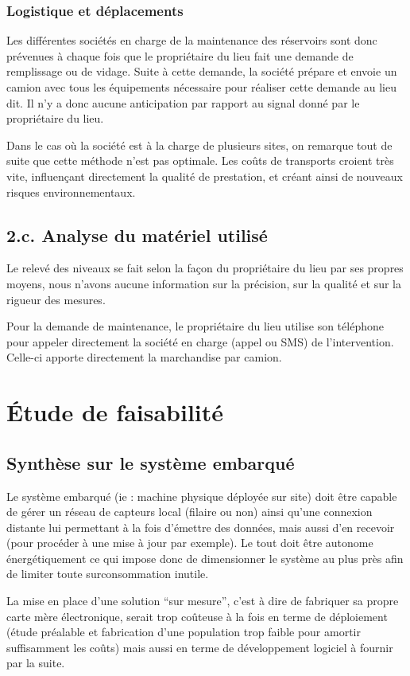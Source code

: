 \documentclass{mise_en_page}
\begin{document}
\subsubsection{Logistique et déplacements}
Les différentes sociétés en charge de la maintenance des réservoirs sont
donc prévenues à chaque fois que le propriétaire du lieu fait une
demande de remplissage ou de vidage. Suite à cette demande, la société
prépare et envoie un camion avec tous les équipements nécessaire pour
réaliser cette demande au lieu dit.  Il n’y a donc aucune anticipation
par rapport au signal donné par le propriétaire du lieu.

Dans le cas où la société est à la charge de plusieurs sites, on
remarque tout de suite que cette méthode n’est pas optimale. Les coûts
de transports croient très vite, influençant directement la qualité de
prestation, et créant ainsi de nouveaux risques environnementaux.

\subsection{2.c. Analyse du matériel utilisé}
Le relevé des niveaux se fait selon la façon du propriétaire du lieu
par ses propres moyens, nous n’avons aucune information sur la
précision, sur la qualité et sur la rigueur des mesures.

Pour la demande de maintenance, le propriétaire du lieu utilise son
téléphone pour appeler directement la société en charge (appel ou SMS)
de l’intervention. Celle-ci apporte directement la marchandise par
camion.

\section{Étude de faisabilité}
\subsection{Synthèse sur le système embarqué}
Le système embarqué (ie : machine physique déployée sur site) doit être
capable de gérer un réseau de capteurs local (filaire ou non) ainsi
qu’une connexion distante lui permettant à la fois d’émettre des
données, mais aussi d’en recevoir (pour procéder à une mise à jour par
exemple). Le tout doit être autonome énergétiquement ce qui impose donc
de dimensionner le système au plus près afin de limiter toute
surconsommation inutile.

La mise en place d’une solution “sur mesure”, c’est à dire de fabriquer
sa propre carte mère électronique, serait trop coûteuse à la fois en
terme de déploiement (étude préalable et fabrication d’une population
trop faible pour amortir suffisamment les coûts) mais aussi en terme de
développement logiciel à fournir par la suite.
\end{document}
